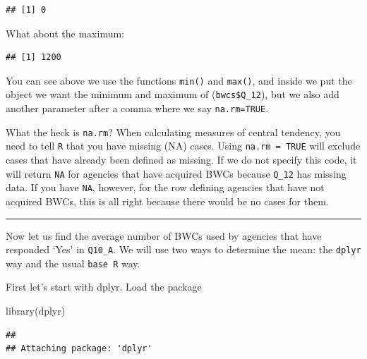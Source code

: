 \documentclass[
]{book}
\newenvironment{Shaded}{\begin{snugshade}}{\end{snugshade}}
\newcommand{\AttributeTok}[1]{\textcolor[rgb]{0.77,0.63,0.00}{#1}}
\newcommand{\ConstantTok}[1]{\textcolor[rgb]{0.00,0.00,0.00}{#1}}
\newcommand{\FunctionTok}[1]{\textcolor[rgb]{0.00,0.00,0.00}{#1}}
\newcommand{\NormalTok}[1]{#1}
\newcommand{\SpecialCharTok}[1]{\textcolor[rgb]{0.00,0.00,0.00}{#1}}
\begin{document}
\begin{verbatim}
## [1] 0
\end{verbatim}

What about the maximum:

\begin{Shaded}
\end{Shaded}

\begin{verbatim}
## [1] 1200
\end{verbatim}

You can see above we use the functions \texttt{min()} and \texttt{max()}, and inside we put the object we want the minimum and maximum of (\texttt{bwcs\$Q\_12}), but we also add another parameter after a comma where we say \texttt{na.rm=TRUE}.

What the heck is \texttt{na.rm}? When calculating measures of central tendency, you need to tell \texttt{R} that you have missing (NA) cases. Using \texttt{na.rm\ =\ TRUE} will exclude cases that have already been defined as missing. If we do not specify this code, it will return \texttt{NA} for agencies that have acquired BWCs because \texttt{Q\_12} has missing data. If you have \texttt{NA}, however, for the row defining agencies that have not acquired BWCs, this is all right because there would be no cases for them.

\begin{center}\rule{0.5\linewidth}{0.5pt}\end{center}

Now let us find the average number of BWCs used by agencies that have responded `Yes' in \texttt{Q10\_A}. We will use two ways to determine the mean: the \texttt{dplyr} way and the usual \texttt{base\ R} way.

First let's start with dplyr. Load the package

\begin{Shaded}
\begin{Highlighting}[]
\FunctionTok{library}\NormalTok{(dplyr)}
\end{Highlighting}
\end{Shaded}

\begin{verbatim}
## 
## Attaching package: 'dplyr'
\end{verbatim}
\end{document}
